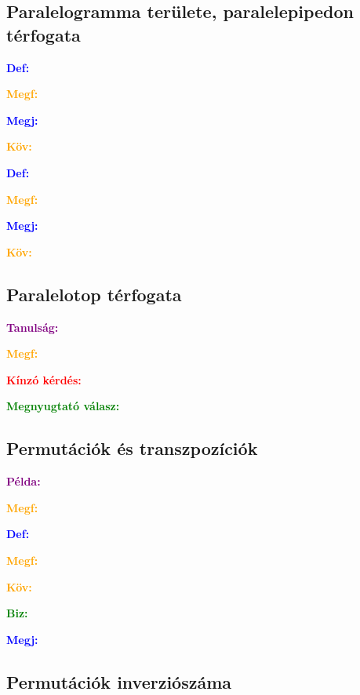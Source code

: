 \documentclass[../szamtud.tex]{subfiles}
\begin{document}
    
    \subsection{Paralelogramma területe, paralelepipedon térfogata}

        \textcolor{blue}{\textbf{Def:}}
        
        \textcolor{orange}{\textbf{Megf:}}

        \textcolor{blue}{\textbf{Megj:}}

        \textcolor{orange}{\textbf{Köv:}}

        \textcolor{blue}{\textbf{Def:}}

        \textcolor{orange}{\textbf{Megf:}}

        \textcolor{blue}{\textbf{Megj:}}

        \textcolor{orange}{\textbf{Köv:}}

    \subsection{Paralelotop térfogata}

        \textcolor{purple}{\textbf{Tanulság:}} 

        \textcolor{orange}{\textbf{Megf:}}

        \textcolor{red}{\textbf{Kínzó kérdés:}} 

        \textcolor{green}{\textbf{Megnyugtató válasz:}}

    \subsection{Permutációk és transzpozíciók}

        \textcolor{purple}{\textbf{Példa:}} 

        \textcolor{orange}{\textbf{Megf:}}

        \textcolor{blue}{\textbf{Def:}}

        \textcolor{orange}{\textbf{Megf:}}

        \textcolor{orange}{\textbf{Köv:}}

        \textcolor{green}{\textbf{Biz:}}

        \textcolor{blue}{\textbf{Megj:}}

    \subsection{Permutációk inverziószáma}
\end{document}
